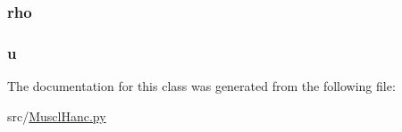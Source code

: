 \hypertarget{classsrc_1_1_muscl_hanc_1_1_hydro_state_ab8ec92cc3ea8422c9349409bae98d2a0}{
\subsubsection[{rho}]{\setlength{\rightskip}{0pt plus 5cm}rho}}\label{classsrc_1_1_muscl_hanc_1_1_hydro_state_ab8ec92cc3ea8422c9349409bae98d2a0}
\hypertarget{classsrc_1_1_muscl_hanc_1_1_hydro_state_a6277e2a7446059985dc9bcf0a4ac1a8f}{
\subsubsection[{u}]{\setlength{\rightskip}{0pt plus 5cm}u}}\label{classsrc_1_1_muscl_hanc_1_1_hydro_state_a6277e2a7446059985dc9bcf0a4ac1a8f}


The documentation for this class was generated from the following file\-:\begin{DoxyCompactItemize}
\item 
src/\hyperlink{_muscl_hanc_8py}{Muscl\-Hanc.\-py}\end{DoxyCompactItemize}
